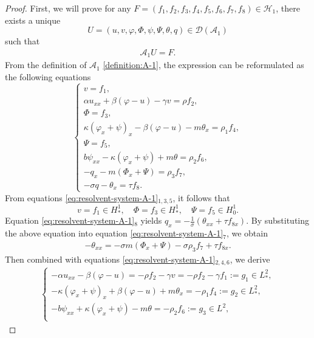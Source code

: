 \documentclass[11pt,reqno]{article}
\begin{document}
\begin{proof}
	First, we will prove for any $F = (f_1,f_2,f_3,f_4,f_5,f_6,f_7,f_8) \in \mathcal{H}_1$, there exists a unique $$U = (u,v,\varphi,\Phi,\psi,\Psi,\theta,q)\in \mathcal{D}(\mathcal{A}_1)$$ such that \begin{align*}
		\mathcal{A}_1U = F.
	\end{align*}
	From the definition of $\mathcal{A}_1$ \eqref{definition:A-1}, the expression can be reformulated as the following equations
	\begin{equation}\label{eq:resolvent-system-A-1}
		\begin{cases}
			v = f_1, \\
			\alpha u_{xx} + \beta (\varphi - u) - \gamma v = \rho f_2, \\
			\Phi = f_3, \\
			\kappa (\varphi_x + \psi)_x - \beta (\varphi - u) - m \theta_x = \rho_1 f_4, \\
			\Psi = f_5, \\
			b \psi_{xx} - \kappa (\varphi_x + \psi) + m\theta = \rho_2 f_6, \\
			-q_x - m (\Phi_x + \Psi) = \rho_3 f_7, \\
			-\sigma q - \theta_x = \tau f_8.
		\end{cases}
	\end{equation}
	From equations \eqref{eq:resolvent-system-A-1}$_{1,3,5}$, it follows that
	\begin{equation}\label{df1}
		v = f_1 \in H_*^1, \quad \Phi = f_3 \in H_*^1, \quad \Psi = f_5 \in H_0^1.
	\end{equation}
	Equation \eqref{eq:resolvent-system-A-1}$_8$ yields
	$q_x=-\frac{1}{\sigma}(\theta_{xx}+\tau f_{8x}).$ By substituting the above equation into equation \eqref{eq:resolvent-system-A-1}$_7$, we obtain
	\begin{align*}
		- \theta_{xx} = - \sigma m(\Phi_x + \Psi) - \sigma \rho_3 f_7 + \tau f_{8x}.
	\end{align*}
	Then combined with equations \eqref{eq:resolvent-system-A-1}$_{2,4,6}$, we derive
	\begin{align}\label{eq:resolvent-system-1-A-1}
		\begin{cases}
			-\alpha u_{xx} - \beta(\varphi - u) = -\rho f_2 - \gamma v=-\rho f_2 - \gamma f_1 := g_1 \in L_*^2, \\
			-\kappa(\varphi_x + \psi)_x + \beta(\varphi - u) + m\theta_x = -\rho_1 f_4 := g_2 \in L_*^2, \\
			- b \psi_{xx} + \kappa(\varphi_x + \psi) - m\theta = -\rho_2 f_6  := g_3 \in L^2, \\

\end{cases}
\end{align}
\end{proof}
\end{document}
